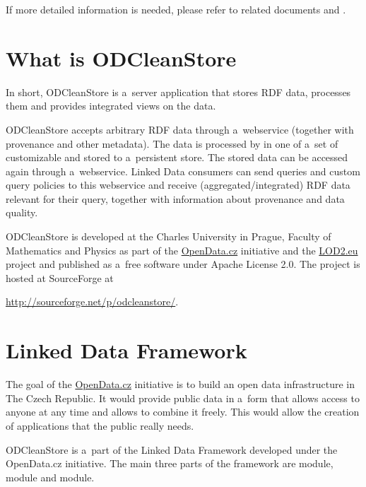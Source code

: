 If more detailed information is needed, please refer to related documents  and .


\section{What is ODCleanStore}

In short, ODCleanStore is a~server application that stores RDF data, processes them and provides integrated views on the data.

ODCleanStore accepts arbitrary RDF data through a~webservice (together with provenance and other metadata). The data is processed by  in one of a~set of customizable  and stored to a~persistent store. The stored data can be accessed again through a~webservice. Linked Data consumers can send queries and custom query policies to this webservice and receive (aggregated/integrated) RDF data relevant for their query, together with information about provenance and data quality.

ODCleanStore is developed at the Charles University in Prague, Faculty of Mathematics and Physics as part of the \href{http://opendata.cz}{OpenData.cz} initiative and the \href{http://lod2.eu}{LOD2.eu} project and published as a~free software under Apache License 2.0. The project is hosted at SourceForge at
\begin{center}
  \url{http://sourceforge.net/p/odcleanstore/}.
\end{center}



\section{Linked Data Framework}

The goal of the \href{http://opendata.cz}{OpenData.cz} initiative is to build an open data infrastructure in The Czech Republic. It would provide public data in a~form that allows access to anyone at any time and allows to combine it freely. This would allow the creation of applications that the public really needs.

ODCleanStore is a~part of the Linked Data Framework developed under the OpenData.cz initiative. The main three parts of the framework are  module,  module and  module.

